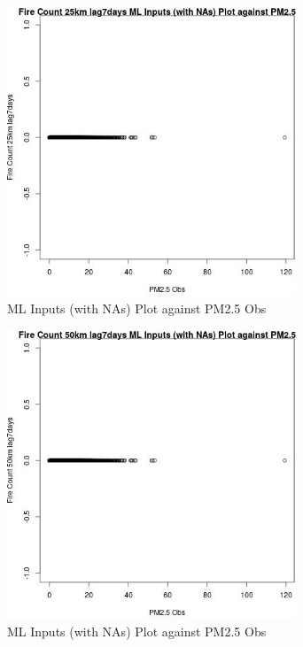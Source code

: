 \begin{figure} 
\centering  
\includegraphics[width=0.77\textwidth]{Code_Outputs/Report_ML_input_PM25_Step4_part_e_de_duplicated_aves_compiled_2019-05-18wNAs_Fire_Count_25km_lag7daysvPM25_Obs.jpg} 
\caption{\label{fig:Report_ML_input_PM25_Step4_part_e_de_duplicated_aves_compiled_2019-05-18wNAsFire_Count_25km_lag7daysvPM25_Obs}ML Inputs (with NAs) Plot against PM2.5 Obs} 
\end{figure} 
 

\clearpage 

\begin{figure} 
\centering  
\includegraphics[width=0.77\textwidth]{Code_Outputs/Report_ML_input_PM25_Step4_part_e_de_duplicated_aves_compiled_2019-05-18wNAs_Fire_Count_50km_lag7daysvPM25_Obs.jpg} 
\caption{\label{fig:Report_ML_input_PM25_Step4_part_e_de_duplicated_aves_compiled_2019-05-18wNAsFire_Count_50km_lag7daysvPM25_Obs}ML Inputs (with NAs) Plot against PM2.5 Obs} 
\end{figure} 
 

